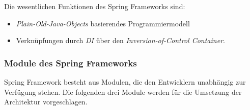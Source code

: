 Die wesentlichen Funktionen des Spring Frameworks sind:
\begin{itemize}
	\item \textit{Plain-Old-Java-Objects} basierendes Programmiermodell
	\item Verknüpfungen durch \textit{DI} über den \textit{Inversion-of-Control Container}.
\end{itemize}

\subsubsection{Module des Spring Frameworks}

Spring Framework besteht aus Modulen, die den Entwicklern unabhängig zur Verfügung stehen. Die folgenden drei Module werden für die Umsetzung der Architektur vorgeschlagen.

